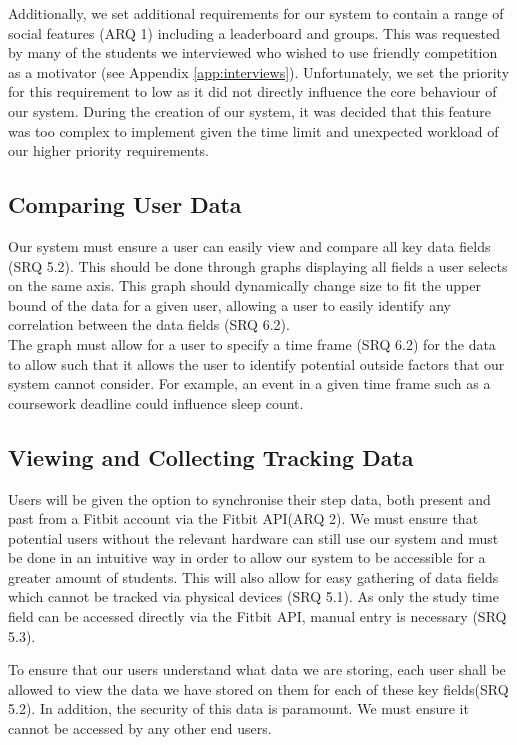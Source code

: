 \documentclass[11pt]{article}
\begin{document}
Additionally, we set additional requirements for our system to contain a range
of social features (ARQ 1) including a leaderboard and groups. This was
requested by many of the students we interviewed who wished to use friendly
competition as a motivator (see Appendix \ref{app:interviews}). Unfortunately,
we set the priority for this requirement to low as it did not directly
influence the core behaviour of our system. During the creation of our system,
it was decided that this feature was too complex to implement  given the time limit and unexpected
workload of our higher priority requirements.


\subsection{Comparing User Data}

Our system must ensure a user can easily view and compare all key data fields (SRQ 5.2). This should be 
done through graphs displaying all fields a user selects on the same axis. 
This graph should dynamically change size to fit the upper bound of the data for a given user, 
allowing a user to easily identify any correlation between the data fields (SRQ 6.2).\\

The graph must allow for a user to 
specify a time frame (SRQ 6.2) for the data to allow such that 
it allows the user to identify potential outside factors
that our system cannot consider. For example, an event in a given time frame
such as a coursework deadline could influence sleep count. 


\subsection{Viewing and Collecting Tracking Data}

Users will be given the option to synchronise their step data, both present and
past from a Fitbit account via the Fitbit API(ARQ 2). We must ensure that
potential users without the relevant hardware can still use our system and must
be done in an intuitive way in order to allow our system to be accessible for a
greater amount of students. This will also allow for easy gathering of data
fields which cannot be tracked via physical devices (SRQ 5.1). As only the
study time field can be accessed directly via the Fitbit API, manual entry is
necessary (SRQ 5.3).\par

To ensure that our users understand what data we are storing, each user shall
be allowed to view the data we have stored on them for each of these key
fields(SRQ 5.2). In addition, the security of this data is paramount. We must ensure it
cannot be accessed by any other end users.
\end{document}
